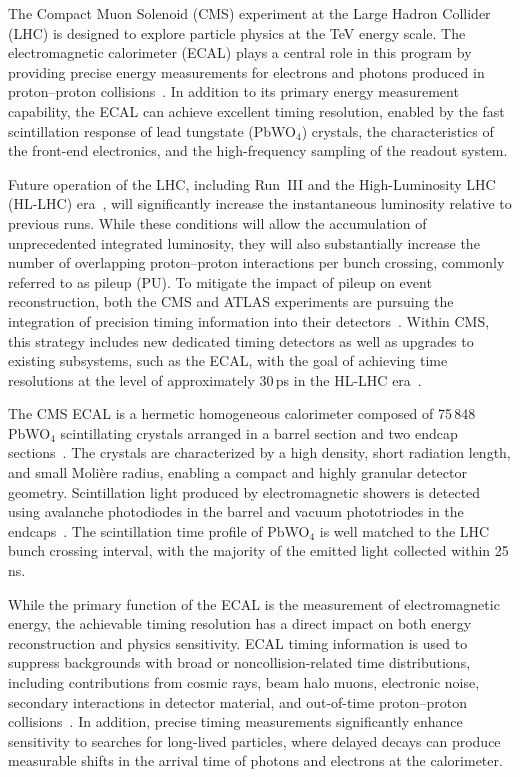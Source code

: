 The Compact Muon Solenoid (CMS) experiment at the Large Hadron Collider (LHC) is designed to explore particle physics at the TeV energy scale.
The electromagnetic calorimeter (ECAL) plays a central role in this program by providing precise energy measurements for electrons and photons produced in proton--proton collisions~\cite{Chatrchyan:1129810}.
In addition to its primary energy measurement capability, the ECAL can achieve excellent timing resolution, enabled by the fast scintillation response of lead tungstate (PbWO$_4$) crystals, the characteristics of the front-end electronics, and the high-frequency sampling of the readout system.

Future operation of the LHC, including Run~III and the High-Luminosity LHC (HL-LHC) era~\cite{Apollinari:2015wtw}, will significantly increase the instantaneous luminosity relative to previous runs.
While these conditions will allow the accumulation of unprecedented integrated luminosity, they will also substantially increase the number of overlapping proton--proton interactions per bunch crossing, commonly referred to as pileup (PU).
To mitigate the impact of pileup on event reconstruction, both the CMS and ATLAS experiments are pursuing the integration of precision timing information into their detectors~\cite{Butler:2019rpu,Morgenstern:2019xto}.
Within CMS, this strategy includes new dedicated timing detectors as well as upgrades to existing subsystems, such as the ECAL, with the goal of achieving time resolutions at the level of approximately 30\,ps in the HL-LHC era~\cite{Bruneliere:2006ra}.

The CMS ECAL is a hermetic homogeneous calorimeter composed of 75\,848 PbWO$_4$ scintillating crystals arranged in a barrel section and two endcap sections~\cite{cmstdr}.
The crystals are characterized by a high density, short radiation length, and small Moli\`ere radius, enabling a compact and highly granular detector geometry.
Scintillation light produced by electromagnetic showers is detected using avalanche photodiodes in the barrel and vacuum phototriodes in the endcaps~\cite{Bayatian:2006nff}.
The scintillation time profile of PbWO$_4$ is well matched to the LHC bunch crossing interval, with the majority of the emitted light collected within 25\,ns.

While the primary function of the ECAL is the measurement of electromagnetic energy, the achievable timing resolution has a direct impact on both energy reconstruction and physics sensitivity.
ECAL timing information is used to suppress backgrounds with broad or noncollision-related time distributions, including contributions from cosmic rays, beam halo muons, electronic noise, secondary interactions in detector material, and out-of-time proton--proton collisions~\cite{Bruneliere:2006ra}.
In addition, precise timing measurements significantly enhance sensitivity to searches for long-lived particles, where delayed decays can produce measurable shifts in the arrival time of photons and electrons at the calorimeter.

